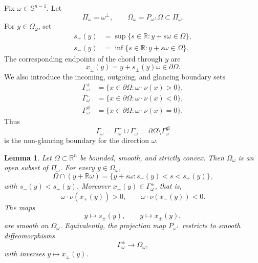 \documentclass[11pt]{article}
\numberwithin{equation}{section}
\newtheorem{lemma}[theorem]{Lemma}
\newcommand{\R}{\mathbb R}
\newcommand{\Sn}{\mathbb S^{n-1}}
\newcommand{\bd}{\partial}
\newcommand{\Om}{\Omega}
\begin{document}
Fix \(\omega\in\Sn\).  Let
\[
    \Pi_\omega=\omega^\perp,
    \qquad
    \Omega_\omega=P_{\omega^\perp}\Omega\subset \Pi_\omega .
\]
For \(y\in\Omega_\omega\), set
\begin{equation}\label{eq:s-plus-minus-def}
\begin{aligned}
    s_+(y)&=\sup\{s\in\R:y+s\omega\in\Omega\},\\
    s_-(y)&=\inf\{s\in\R:y+s\omega\in\Omega\}.
\end{aligned}
\end{equation}
The corresponding endpoints of the chord through $y$ are
\begin{equation}\label{eq:chord-endpoints}
    x_\pm(y)=y+s_\pm(y)\omega\in\bd\Om.
\end{equation}
We also introduce the incoming, outgoing, and glancing boundary sets
\begin{equation}\label{eq:incoming-outgoing-glancing}
\begin{aligned}
    \Gamma_\omega^+&=\{x\in\bd\Om:\omega\cdot\nu(x)>0\},\\
    \Gamma_\omega^-&=\{x\in\bd\Om:\omega\cdot\nu(x)<0\},\\
    \Gamma_\omega^{\mathrm{gl}}&=\{x\in\bd\Om:\omega\cdot\nu(x)=0\}.
\end{aligned}
\end{equation}
Thus
\[
    \Gamma_\omega=\Gamma_\omega^+\cup\Gamma_\omega^-
    =\bd\Om\setminus\Gamma_\omega^{\mathrm{gl}}
\]
is the non-glancing boundary for the direction \(\omega\).

\begin{lemma}\label{lem:chord-parametrization}
Let \(\Om\subset\R^n\) be bounded, smooth, and strictly convex.  Then \(\Omega_\omega\) is an open subset of \(\Pi_\omega\).  For every \(y\in\Omega_\omega\),
\begin{equation}\label{eq:chord-interval}
    \Omega\cap (y+\R\omega)
    =
    \{y+s\omega:s_-(y)<s<s_+(y)\},
\end{equation}
with \(s_-(y)<s_+(y)\).  Moreover \(x_\pm(y)\in\Gamma_\omega^\pm\), that is,
\begin{equation}\label{eq:normal-signs}
    \omega\cdot \nu(x_+(y))>0,
    \qquad
    \omega\cdot \nu(x_-(y))<0.
\end{equation}
The maps
\[
    y\mapsto s_\pm(y),
    \qquad
    y\mapsto x_\pm(y),
\]
are smooth on \(\Omega_\omega\).  Equivalently, the projection map \(P_{\omega^\perp}\) restricts to smooth diffeomorphisms
\[
    \Gamma_\omega^\pm \longrightarrow \Omega_\omega,
\]
with inverses \(y\mapsto x_\pm(y)\).
\end{lemma}
\end{document}
